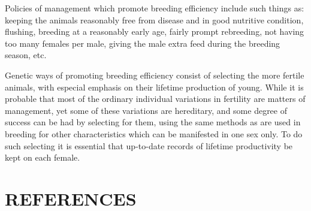 Policies of management which promote breeding efficiency include
such things as: keeping the animals reasonably free from disease and in
good nutritive condition, flushing, breeding at a reasonably early age,
fairly prompt rebreeding, not having too many females per male, giving
the male extra feed during the breeding season, etc.

Genetic ways of promoting breeding efficiency consist of selecting
the more fertile animals, with especial emphasis on their lifetime production
of young. While it is probable that most of the ordinary individual
variations in fertility are matters of management, yet some of
these variations are hereditary, and some degree of success can be had
by selecting for them, using the same methods as are used in breeding
for other characteristics which can be manifested in one sex only. To do
such selecting it is essential that up-to-date records of lifetime productivity
be kept on each female.

\section*{REFERENCES}

